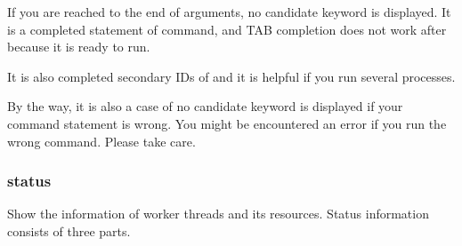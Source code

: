 \documentclass[a4paper,11pt,openany,oneside,english]{sphinxmanual}
\begin{document}
If you are reached to the end of arguments, no candidate keyword is displayed.
It is a completed statement of  command, and TAB
completion does not work after  because it is ready to run.

\begin{sphinxVerbatim}[commandchars=\\\{\},formatcom=\footnotesize]
\end{sphinxVerbatim}

It is also completed secondary IDs of  and it is helpful if you run
several  processes.

\begin{sphinxVerbatim}[commandchars=\\\{\},formatcom=\footnotesize]
\end{sphinxVerbatim}

By the way, it is also a case of no candidate keyword is displayed if your
command statement is wrong. You might be encountered an error if you run the
wrong command. Please take care.

\begin{sphinxVerbatim}[commandchars=\\\{\},formatcom=\footnotesize]
\end{sphinxVerbatim}


\subsubsection{status}
\label{\detokenize{commands/secondary/spp_vf:status}}\label{\detokenize{commands/secondary/spp_vf:commands-spp-vf-status}}
Show the information of worker threads and its resources. Status information
consists of three parts.
\end{document}
